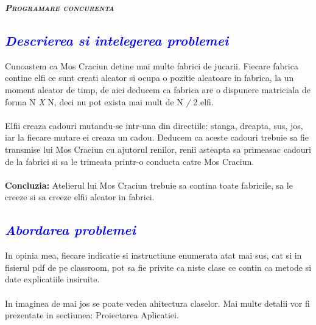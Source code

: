 \documentclass{article}
\begin{document}
    \begin{center}
        \textsc{\Huge \textbf{\itshape Programare concurenta}}\\[0.2cm]
         \vspace{5mm}
    \end{center}
\textcolor{blue}{\subsection{\itshape \textcolor{blue}{Descrierea si intelegerea problemei }}}
\vspace{5mm}    
Cunoastem ca Mos Craciun detine mai multe fabrici de jucarii. Fiecare fabrica contine elfi ce sunt creati aleator si ocupa o pozitie aleatoare in fabrica, la un moment aleator de timp, de aici deducem ca fabrica are o dispunere matriciala de forma N \emph X N, deci nu pot exista mai mult de N \emph / 2 elfi.\\\\
Elfii creaza cadouri mutandu-se intr-una din directiile: stanga, dreapta, sus, jos, iar la fiecare mutare ei creaza un cadou. Deducem ca aceste cadouri trebuie sa fie transmise lui Mos Craciun cu ajutorul renilor, renii asteapta sa primeasac cadouri de la fabrici si sa le trimeata printr-o conducta catre Mos Craciun.\\\\
\textbf{Concluzia: } Atelierul lui Mos Craciun trebuie sa contina toate fabricile, sa le creeze si sa creeze elfii aleator in fabrici.

\vspace{5mm}
\textcolor{blue}{\subsection{\itshape \textcolor{blue}{ Abordarea  problemei }}}
\vspace{5mm}
In opinia mea, fiecare indicatie si instructiune enumerata atat mai sus, cat si in fisierul pdf de pe classroom, pot sa fie privite ca niste clase ce contin ca metode si date explicatiile insiruite.\\\\
In imaginea de mai jos se poate vedea ahitectura claselor. Mai multe detalii vor fi prezentate in sectiunea: Proiectarea Aplicatiei.
\end{document}
